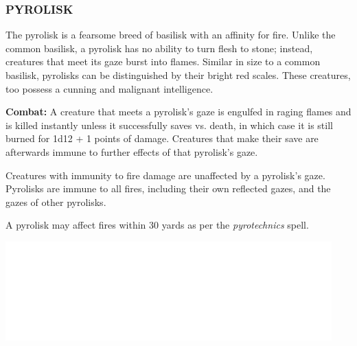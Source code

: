 \begin{multicols}{2}
\subsubsection{PYROLISK}

The pyrolisk is a fearsome breed of basilisk with an affinity for fire. Unlike the common basilisk, a pyrolisk has no ability to turn flesh to stone; instead, creatures that meet its gaze burst into flames. Similar in size to a common basilisk, pyrolisks can be distinguished by their bright red scales. These creatures, too possess a cunning and malignant intelligence.

\textbf{Combat:} A creature that meets a pyrolisk's gaze is engulfed in raging flames and is killed instantly unless it successfully saves vs. death, in which case it is still burned for 1d12 + 1 points of damage. Creatures that make their save are afterwards immune to further effects of that pyrolisk's gaze. 

Creatures with immunity to fire damage are unaffected by a pyrolisk's gaze. Pyrolisks are immune to all fires, including their own reflected gazes, and the gazes of other pyrolisks.

A pyrolisk may affect fires within 30 yards as per the \textit{pyrotechnics} spell.

\noindent\includegraphics[width=\columnwidth, height=1.5in]{testblock.pdf} 

\end{multicols}

